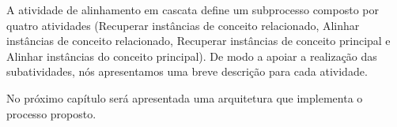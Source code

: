 A atividade de alinhamento em cascata define um subprocesso composto por quatro atividades (Recuperar instâncias de conceito relacionado, Alinhar instâncias de conceito relacionado, Recuperar instâncias de conceito principal e Alinhar instâncias do conceito principal). De modo a apoiar a realização das subatividades, nós apresentamos uma breve descrição para cada atividade.

No próximo capítulo será apresentada uma arquitetura  que implementa o processo proposto.

